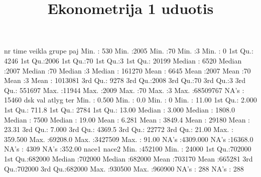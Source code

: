 \documentclass[a4paper]{article}
\title{Ekonometrija 1 uduotis}
\begin{document}
\maketitle

\begin{Schunk}
\begin{Soutput}
       nr             time          veikla       grupe        paj          
 Min.   :  530   Min.   :2005   Min.   :70   Min.   :3   Min.   :       0  
 1st Qu.: 4246   1st Qu.:2006   1st Qu.:70   1st Qu.:3   1st Qu.:   20199  
 Median : 6520   Median :2007   Median :70   Median :3   Median :  161270  
 Mean   : 6645   Mean   :2007   Mean   :70   Mean   :3   Mean   : 1013081  
 3rd Qu.: 9278   3rd Qu.:2008   3rd Qu.:70   3rd Qu.:3   3rd Qu.:  551697  
 Max.   :11944   Max.   :2009   Max.   :70   Max.   :3   Max.   :68509767  
                                                         NA's   :   15460  
      dsk                val              atlyg              ter        
 Min.   :   0.500   Min.   :    0.0   Min.   :      0   Min.   : 11.00  
 1st Qu.:   2.000   1st Qu.:  711.8   1st Qu.:   2784   1st Qu.: 13.00  
 Median :   3.000   Median : 1808.0   Median :   7500   Median : 19.00  
 Mean   :   6.281   Mean   : 3849.4   Mean   :  29180   Mean   : 23.31  
 3rd Qu.:   7.000   3rd Qu.: 4369.5   3rd Qu.:  22772   3rd Qu.: 21.00  
 Max.   : 359.500   Max.   :69208.0   Max.   :3427509   Max.   : 91.00  
 NA's   :4309.000   NA's   :16368.0   NA's   :   4309   NA's   :352.00  
     nace1            nace2       
 Min.   :452100   Min.   : 24000  
 1st Qu.:702000   1st Qu.:682000  
 Median :702000   Median :682000  
 Mean   :703170   Mean   :665281  
 3rd Qu.:702000   3rd Qu.:682000  
 Max.   :930500   Max.   :960900  
 NA's   :   288   NA's   :   288  
\end{Soutput}
\end{Schunk}
\end{document}
